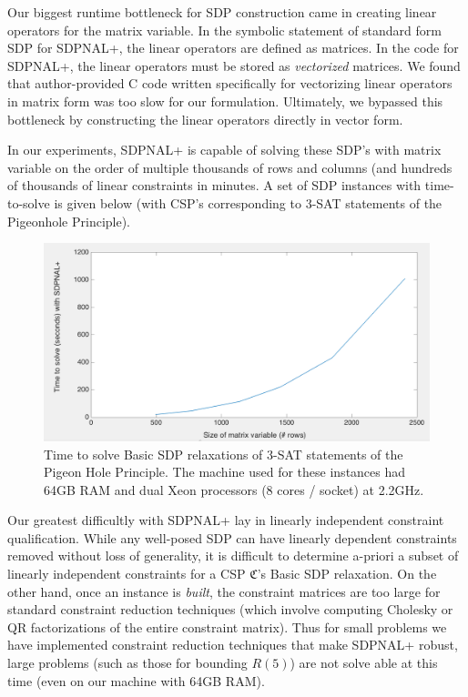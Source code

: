 \documentclass[12pt]{article} %
\begin{document}
Our biggest runtime bottleneck for SDP construction came in creating linear operators for the matrix variable. In the symbolic statement of standard form SDP for SDPNAL+, the linear operators are defined as matrices. In the code for SDPNAL+, the linear operators must be stored as \textit{vectorized} matrices. We found that author-provided C code written specifically for vectorizing linear operators in matrix form was too slow for our formulation. Ultimately, we bypassed this bottleneck by constructing the linear operators directly in vector form.

In our experiments, SDPNAL+ is capable of solving these SDP's with matrix variable on the order of multiple thousands of rows and columns (and hundreds of thousands of linear constraints in minutes. A set of SDP instances with time-to-solve is given below (with CSP's corresponding to 3-SAT statements of the Pigeonhole Principle).

\begin{figure}[htb]
\includegraphics[width=\textwidth]{images/runtime}
\caption{Time to solve Basic SDP relaxations of 3-SAT statements of the Pigeon Hole Principle. The machine used for these instances had 64GB RAM and dual Xeon processors (8 cores / socket) at 2.2GHz.}
\end{figure}

Our greatest difficultly with SDPNAL+ lay in linearly independent constraint qualification. While any well-posed SDP can have linearly dependent constraints removed without loss of generality, it is difficult to determine a-priori a subset of linearly independent constraints for a CSP $\mathfrak{C}$'s Basic SDP relaxation. On the other hand, once an instance is \textit{built}, the constraint matrices are too large for standard constraint reduction techniques (which involve computing Cholesky or QR factorizations of the entire constraint matrix). Thus for small problems we have implemented constraint reduction techniques that make SDPNAL+ robust, large problems (such as those for bounding $R(5)$) are not solve able at this time (even on our machine with 64GB RAM).
\end{document}
